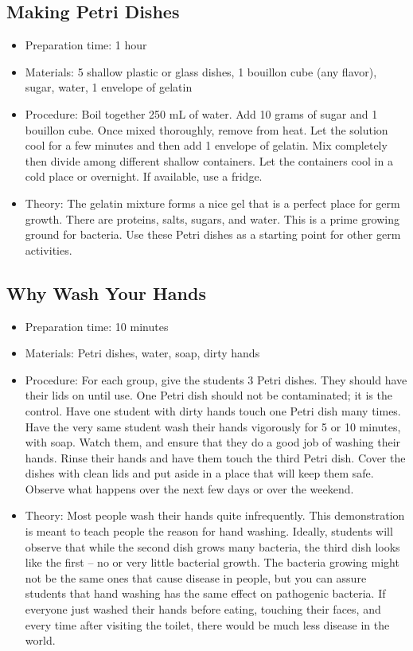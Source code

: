 \subsection{Making Petri Dishes}
\begin{itemize}
\item{Preparation time: 1 hour}
\item{Materials: 5 shallow plastic or glass dishes, 1 bouillon cube (any flavor), sugar, water, 1 envelope of gelatin}
\item{Procedure: Boil together 250 mL of water. Add 10 grams of sugar and 1 bouillon cube. Once mixed thoroughly, remove from heat. Let the solution cool for a few minutes and then add 1 envelope of gelatin. Mix completely then divide among different shallow containers. Let the containers cool in a cold place or overnight. If available, use a fridge.}
\item{Theory: The gelatin mixture forms a nice gel that is a perfect place for germ growth. There are proteins, salts, sugars, and water. This is a prime growing ground for bacteria. Use these Petri dishes as a starting point for other germ activities.}
\end{itemize}

\subsection{Why Wash Your Hands}
\begin{itemize}
\item{Preparation time: 10 minutes}
\item{Materials: Petri dishes, water, soap, dirty hands}
\item{Procedure: For each group, give the students 3 Petri dishes. They should have their lids on until use. One Petri dish should not be contaminated; it is the control. Have one student with dirty hands touch one Petri dish many times. Have the very same student wash their hands vigorously for 5 or 10 minutes, with soap. Watch them, and ensure that they do a good job of washing their hands. Rinse their hands and have them touch the third Petri dish. Cover the dishes with clean lids and put aside in a place that will keep them safe. Observe what happens over the next few days or over the weekend.}
\item{Theory: Most people wash their hands quite infrequently. This demonstration is meant to teach people the reason for hand washing. Ideally, students will observe that while the second dish grows many bacteria, the third dish looks like the first -- no or very little bacterial growth. The bacteria growing might not be the same ones that cause disease in people, but you can assure students that hand washing has the same effect on pathogenic bacteria. If everyone just washed their hands before eating, touching their faces, and every time after visiting the toilet, there would be much less disease in the world.}
\end{itemize}

